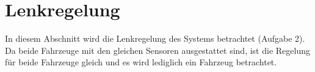 \chapter{Lenkregelung}\label{sec:Lenkregelung}
In diesem Abschnitt wird die Lenkregelung des Systems betrachtet (Aufgabe 2). Da
beide Fahrzeuge mit den gleichen Sensoren ausgestattet sind, ist die Regelung
für beide Fahrzeuge gleich und es wird lediglich ein Fahrzeug betrachtet.
